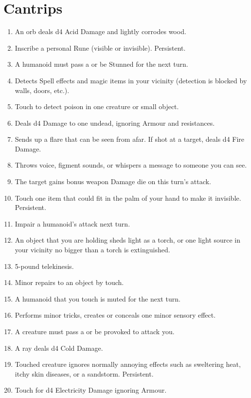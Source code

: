 \documentclass[itdr/core]{subfiles}
\begin{document}
\section{Cantrips}
\def \spellcircle {C}
\begin{enumerate}
	\item {} An orb deals d4 Acid Damage and lightly corrodes wood.
	\item {} Inscribe a personal Rune (visible or invisible). Persistent.
	\item {} A humanoid must pass a  or be Stunned for the next turn.
	\item {} Detects Spell effects and magic items in your vicinity (detection is blocked by walls, doors, etc.).
	\item {} Touch to detect poison in one creature or small object.
	\item {} Deals d4 Damage to one \mbox{undead}, ignoring Armour and resistances.
	\item {} Sends up a flare that can be seen from afar. If shot at a target, deals d4 Fire Damage.
	\item {} Throws voice, figment sounds, or whispers a message to someone you can see.
	\item {} The target gains bonus weapon Damage die on this turn's attack.
	\item {} Touch one item that could fit in the palm of your hand to make it invisible. Persistent.
	\item {} Impair a humanoid's attack next turn.
	\item {} An object that you are holding sheds light as a torch, or one light source in your vicinity no bigger than a torch is extinguished.
	\item {} 5-pound telekinesis.
	\item {} Minor repairs to an object by touch.
	\item {} A humanoid that you touch is muted for the next turn.
	\item {} Performs minor tricks, creates or conceals one minor sensory effect.
	\item {} A creature must pass a  or be provoked to attack you.
	\item {} A ray deals d4 Cold Damage.
	\item {} Touched creature ignores normally annoying effects such as sweltering heat, itchy skin diseases, or a sandstorm. Persistent.
	\item {} Touch for d4 Electricity Damage ignoring Armour.
\end{enumerate}
\end{document}
